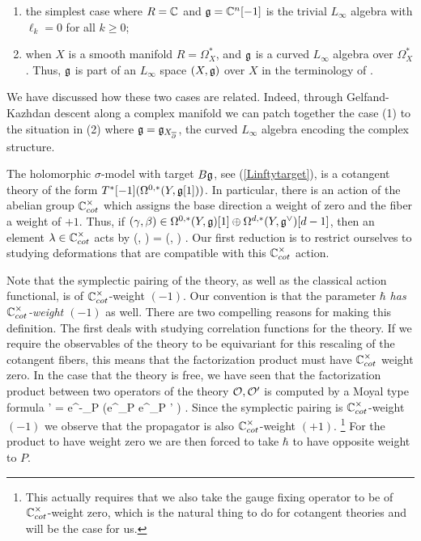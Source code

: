 \documentclass[10pt]{amsart}
\begin{document}
\begin{enumerate}
\item the simplest case where $R = \mathbb C$ and $\mathfrak g = \mathbb C^n[-1]$ is the trivial $L_\infty$ algebra with $\ell_k = 0$ for all $k \geq 0$; 
\item when $X$ is a smooth manifold $R = \Omega^*_X$, and $\mathfrak g$ is a curved $L_\infty$ algebra over $\Omega^*_X$. 
Thus, $\mathfrak g$ is part of an $L_\infty$ space $(X, \mathfrak g)$ over $X$ in the terminology of \cite{wg2, GradyGwilliamDerived}.
\end{enumerate}

We have discussed how these two cases are related.
Indeed, through Gelfand-Kazhdan descent along a complex manifold we can patch together the case (1) to the situation in (2) where $\mathfrak g = \mathfrak g_{X_{\overline{\partial}}}$, the curved $L_\infty$ algebra encoding the complex structure. 

The holomorphic $\sigma$-model with target $B\mathfrak g$, see (\ref{Linftytarget}), is a cotangent theory of the form $T^*[-1] (\Omega^{0,*}(Y, \mathfrak g[1]))$. 
In particular, there is an action of the abelian group $\mathbb C^\times_{cot}$ which assigns the base direction a weight of zero and the fiber a weight of $+1$. 
Thus, if $(\gamma, \beta) \in \Omega^{0,*}(Y, \mathfrak g) [1] \oplus \Omega^{d,*}(Y, \mathfrak g^\vee)[d-1]$, then an element $\lambda \in \mathbb C^\times_{cot}$ acts by
\ben
\lambda \cdot (\gamma, \beta) = (\gamma, \lambda \beta) .
\een
Our first reduction is to restrict ourselves to studying deformations that are compatible with this $\mathbb C^\times_{cot}$ action.

Note that the symplectic pairing of the theory, as well as the classical action functional, is of $\mathbb C^{\times}_{cot}$-weight $(-1)$.
Our convention is that the parameter $\hbar$ {\em has $\mathbb C^\times_{cot}$-weight $(-1)$} as well. 
There are two compelling reasons for making this definition. 
The first deals with studying correlation functions for the theory. 
If we require the observables of the theory to be equivariant for this rescaling of the cotangent fibers, this means that the factorization product must have $\mathbb C^\times_{cot}$ weight zero.
In the case that the theory is free, we have seen that the factorization product between two operators of the theory $\mathcal O, \mathcal O'$ is computed by a Moyal type formula
\ben
\cO \star \cO' = e^{-\hbar \partial_P} \left(e^{\hbar \partial_P} \cO \cdot e^{\hbar \partial_P} \cO' \right) .
\een
Since the symplectic pairing is $\mathbb C^\times_{cot}$-weight $(-1)$ we observe that the propagator is also $\mathbb C^\times_{cot}$-weight $(+1)$.
\footnote{This actually requires that we also take the gauge fixing operator to be of $\mathbb C^\times_{cot}$-weight zero, which is the natural thing to do for cotangent theories and will be the case for us.}
For the product to have weight zero we are then forced to take $\hbar$ to have opposite weight to $P$.
\end{document}
